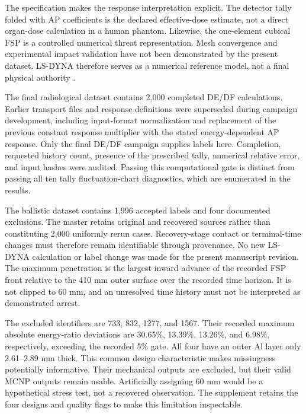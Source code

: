 The specification makes the response interpretation explicit. The detector tally folded with AP coefficients is the declared effective-dose estimate, not a direct organ-dose calculation in a human phantom. Likewise, the one-element cubical FSP is a controlled numerical threat representation. Mesh convergence and experimental impact validation have not been demonstrated by the present dataset. LS-DYNA therefore serves as a numerical reference model, not a final physical authority \cite{Kulesza2022MCNP63,Hallquist2006,JohnsonCook1983,JohnsonHolmquist1994}.

The final radiological dataset contains 2,000 completed DE/DF calculations. Earlier transport files and response definitions were superseded during campaign development, including input-format normalization and replacement of the previous constant response multiplier with the stated energy-dependent AP response. Only the final DE/DF campaign supplies labels here. Completion, requested history count, presence of the prescribed tally, numerical relative error, and input hashes were audited. Passing this computational gate is distinct from passing all ten tally fluctuation-chart diagnostics, which are enumerated in the results.

The ballistic dataset contains 1,996 accepted labels and four documented exclusions. The master retains original and recovered sources rather than constituting 2,000 uniformly rerun cases. Recovery-stage contact or terminal-time changes must therefore remain identifiable through provenance. No new LS-DYNA calculation or label change was made for the present manuscript revision. The maximum penetration is the largest inward advance of the recorded FSP front relative to the 410 mm outer surface over the recorded time horizon. It is not clipped to 60 mm, and an unresolved time history must not be interpreted as demonstrated arrest.

The excluded identifiers are 733, 832, 1277, and 1567. Their recorded maximum absolute energy-ratio deviations are 30.65\%, 13.39\%, 13.26\%, and 6.98\%, respectively, exceeding the recorded 5\% gate. All four have an outer Al layer only 2.61--2.89 mm thick. This common design characteristic makes missingness potentially informative. Their mechanical outputs are excluded, but their valid MCNP outputs remain usable. Artificially assigning 60 mm would be a hypothetical stress test, not a recovered observation. The supplement retains the four designs and quality flags to make this limitation inspectable.

